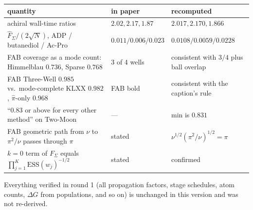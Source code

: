 \documentclass[11pt]{article}
\newcommand{\ESS}{\mathrm{ESS}}
\begin{document}
\begin{center}
\small
\setlength{\tabcolsep}{4pt}
\begin{tabular}{@{}p{}p{}p{}@{}}
\toprule
quantity & in paper & recomputed \\
\midrule
achiral wall-time ratios & $2.02,2.17,1.87$ & $2.017,2.170,1.866$ \\
$\hat F_\Sigma/(2\sqrt N)$, ADP / butanediol / Ac-Pro & $0.011/0.006/0.023$ & $0.0108/0.0059/0.0228$ \\
FAB coverage as a mode count: Himmelblau $0.736$, Sparse $0.768$ & 3 of 4 wells & consistent with $3/4$ plus ball overlap \\
FAB Three-Well $0.985$ vs.\ mode-complete KLXX $0.982$, $\hat\pi$-only $0.968$ & FAB bold & consistent with the caption's rule \\
``$0.83$ or above for every other method'' on Two-Moon & --- & min is $0.831$ \\
FAB geometric path from $\nu$ to $\pi^2/\nu$ passes through $\pi$ & stated & $\nu^{1/2}(\pi^2/\nu)^{1/2}=\pi$ \\
$k=0$ term of $F_\Sigma$ equals $\prod_{j=1}^K\ESS(w_j)^{-1/2}$ & stated & confirmed \\
\bottomrule
\end{tabular}
\end{center}

\noindent
Everything verified in round 1 (all propagation factors, stage schedules, atom
counts, $\Delta G$ from populations, and so on) is unchanged in this version
and was not re-derived.
\end{document}
